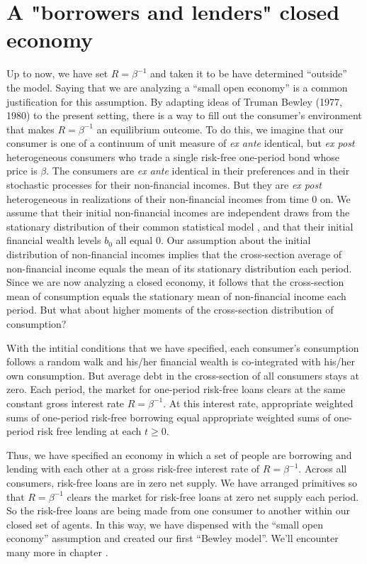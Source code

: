 \section{A "borrowers and lenders" closed economy}\label{sec:borrowlender}%
Up to now, we have set $R = \beta^{-1}$  and  taken it to be have  
determined ``outside'' the model.  Saying that we are analyzing a ``small open economy''  is a common justification  for this assumption.
%
By adapting ideas of   Truman Bewley (1977, 1980) to the present  setting, there is a way to fill out 
the  consumer's environment  that makes  $R = \beta^{-1}$ an equilibrium outcome.  
To do this, we imagine that our consumer is one of a  continuum of unit measure of  {\it ex ante} identical, but {\it ex post} heterogeneous consumers who trade a single risk-free one-period bond whose price is $\beta$.  
The consumers are {\it ex ante} identical in their preferences and in their stochastic processes for 
their non-financial incomes.  But they are {\it ex post} heterogeneous in  realizations of their non-financial incomes from time $0$ on.  We assume that their initial
non-financial incomes are independent draws from the stationary distribution  of their common statistical model , and that their initial financial wealth levels $b_0$  all equal  $0$. Our assumption about the initial distribution of non-financial incomes implies that the cross-section average of non-financial income equals the mean of its  stationary distribution each period.   
Since we are now analyzing a closed economy, it follows that the cross-section mean of consumption equals the stationary mean of non-financial income each period. 
But what about higher moments of the cross-section distribution of consumption? 


With the intitial conditions that we have specified, each consumer's consumption follows a random walk and his/her financial wealth is co-integrated with his/her own consumption. But average debt in the cross-section of all consumers stays at zero.   Each period, the market for one-period risk-free loans clears at the same 
constant gross interest rate $R = \beta^{-1}$. At this interest rate,  appropriate weighted sums of one-period risk-free borrowing equal  appropriate weighted sums of one-period risk free lending at each $t \geq 0$. 


Thus, we have specified  an economy in which a  set of people are borrowing and lending
with each other at a gross risk-free interest rate of
$R = \beta^{-1}$.
Across all consumers, risk-free loans are in zero net supply.
We have arranged primitives so that $R = \beta^{-1}$ clears the market for risk-free loans at zero net supply each period. 
So the risk-free loans are being made from one consumer to another within our closed set of agents.
In this way, we have dispensed with the ``small open economy'' assumption and created our 
first ``Bewley model''.  We'll encounter many more in chapter .

